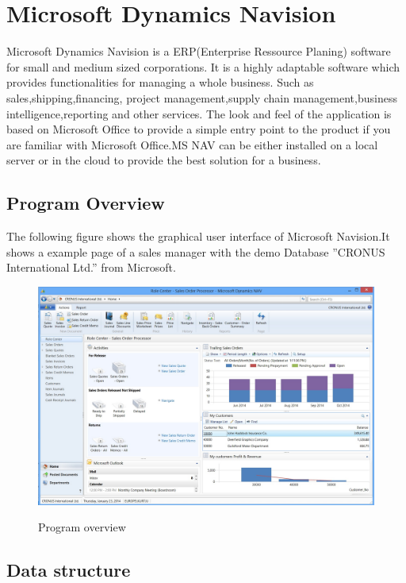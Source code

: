   \section{Microsoft Dynamics Navision}
  Microsoft Dynamics Navision is a ERP(Enterprise Ressource Planing) software for small and medium sized corporations. It is a highly adaptable software which provides functionalities for managing a whole business. Such as sales,shipping,financing, project management,supply chain management,business intelligence,reporting and other services. 
  The look and feel of the application is based on Microsoft Office to provide a simple entry point to the product if you are familiar with Microsoft Office.MS NAV can be either installed on a local server or in the cloud to provide the best solution for a business.\cite{navOver} 
  
  \subsection{Program Overview}
  The following figure shows the graphical user interface of Microsoft Navision.It shows a example page of a sales manager with the demo Database ''CRONUS International Ltd.'' from Microsoft.
  \begin{figure}[htbp]
  \centering
  \includegraphics[width=\textwidth,height=\textheight,keepaspectratio]{graphics/navSales.jpg}
  \caption{Program overview}\cite{azureOver}
  \end{figure}
  \newpage
  
  \subsection{Data structure}
